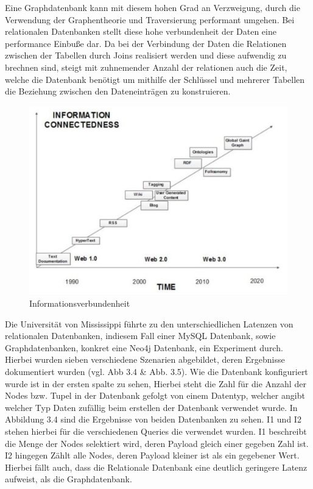 \noindent
Eine Graphdatenbank kann mit diesem hohen Grad an Verzweigung, durch die Verwendung der Graphentheorie und Traversierung performant umgehen.  Bei relationalen Datenbanken stellt diese hohe verbundenheit der Daten eine performance Einbuße dar.  Da bei der Verbindung der Daten die Relationen zwischen der Tabellen durch Joins realisiert werden und diese aufwendig zu brechnen sind, steigt mit zuhnemender Anzahl der relationen auch die Zeit, welche die Datenbank benötigt um mithilfe der Schlüssel und mehrerer Tabellen die Beziehung zwischen den Dateneinträgen zu konstruieren. \citep{9677042} \citep{graphdb}
\begin{figure}[H]
	\centering
	\includegraphics[scale=.45]{Illustrations/informationconnectedness.png}
	\caption{Informationsverbundenheit \citep{performancenosql}}
\end{figure}
\noindent
Die Universität von Mississippi führte zu den unterschiedlichen Latenzen von relationalen Datenbanken, indiesem Fall einer MySQL Datenbank, sowie Graphdatenbanken, konkret eine Neo4j Datenbank, ein Experiment durch. Hierbei wurden sieben verschiedene Szenarien abgebildet, deren Ergebnisse dokumentiert wurden (vgl. Abb 3.4 \& Abb. 3.5).
Wie die Datenbank konfiguriert wurde ist in der ersten spalte zu sehen, Hierbei steht die Zahl für die Anzahl der Nodes bzw. Tupel in der Datenbank gefolgt von einem Datentyp, welcher angibt welcher Typ Daten zufällig beim erstellen der Datenbank verwendet wurde. In Abbildung 3.4 sind die Ergebnisse von beiden Datenbanken zu sehen. I1 und I2 stehen hierbei für die verschiedenen Queries die verwendet wurden. I1 beschreibt die Menge der Nodes selektiert wird, deren Payload gleich einer gegeben Zahl ist. I2 hingegen Zählt alle Nodes, deren Payload kleiner ist als ein gegebener Wert. Hierbei fällt auch, dass die Relationale Datenbank eine deutlich geringere Latenz aufweist, als die Graphdatenbank. 
